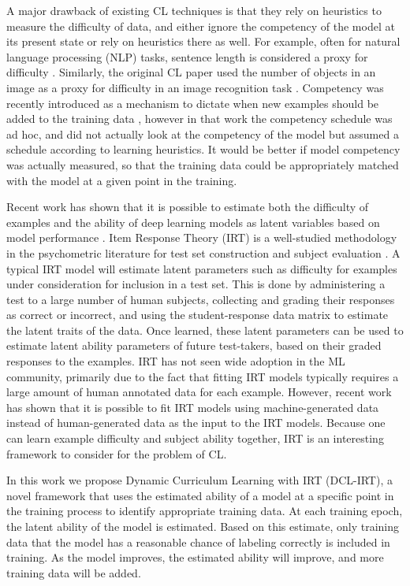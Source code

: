 \documentclass[letterpaper]{article} %
\begin{document}
A major drawback of existing CL techniques is that they rely on heuristics to measure the difficulty of data, and either ignore the competency of the model at its present state or rely on heuristics there as well.
For example, often for natural language processing (NLP) tasks, sentence length is considered a proxy for difficulty \cite{bengio_curriculum_2009,platanios_competence-based_2019}.
Similarly, the original CL paper used the number of objects in an image as a proxy for difficulty in an image recognition task \cite{bengio_curriculum_2009}.
Competency was recently introduced as a mechanism to dictate when new examples should be added to the training data \cite{platanios_competence-based_2019}, however in that work the competency schedule was ad hoc, and did not actually look at the competency of the model but assumed a schedule according to learning heuristics. 
It would be better if model competency was actually measured, so that the training data could be appropriately matched with the model at a given point in the training.

Recent work has shown that it is possible to estimate both the difficulty of examples and the ability of deep learning models as latent variables based on model performance \cite{lalor_learning_2019}.
Item Response Theory (IRT) is a well-studied methodology in the psychometric literature for test set construction and subject evaluation \cite{baker_item_2004}.
A typical IRT model will estimate latent parameters such as difficulty for examples under consideration for inclusion in a test set.
This is done by administering a test to a large number of human subjects, collecting and grading their responses as correct or incorrect, and using the student-response data matrix to estimate the latent traits of the data.
Once learned, these latent parameters can be used to estimate latent ability parameters of future test-takers, based on their graded responses to the examples.
IRT has not seen wide adoption in the ML community, primarily due to the fact that fitting IRT models typically requires a large amount of human annotated data for each example.
However, recent work has shown that it is possible to fit IRT models using machine-generated data instead of human-generated data as the input to the IRT models.
Because one can learn example difficulty and subject ability together, IRT is an interesting framework to consider for the problem of CL. 

In this work we propose Dynamic Curriculum Learning with IRT (DCL-IRT), a novel framework that uses the estimated ability of a model at a specific point in the training process to identify appropriate training data.
At each training epoch, the latent ability of the model is estimated.
Based on this estimate, only training data that the model has a reasonable chance of labeling correctly is included in training.
As the model improves, the estimated ability will improve, and more training data will be added.
\end{document}
